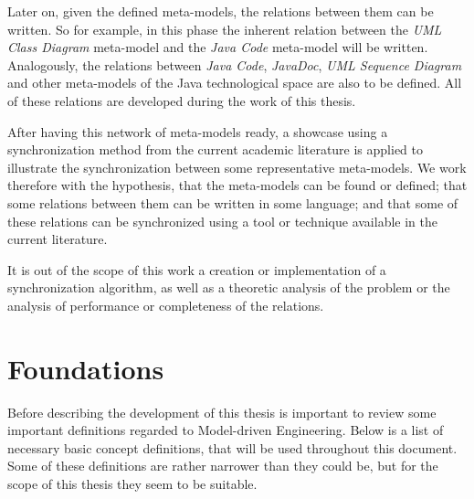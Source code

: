 \documentclass[tuberlin,cic,tc,english,noabntcite]{iiufrgs}
\begin{document}
Later on, given the defined meta-models, the relations between them can be written. So for example, in this phase the inherent relation between the \emph{UML Class Diagram} meta-model and the \emph{Java Code} meta-model will be written. Analogously, the relations between \emph{Java Code}, \emph{JavaDoc}, \emph{UML Sequence Diagram} and other meta-models of the Java technological space are also to be defined. All of these relations are developed during the work of this thesis.

After having this network of meta-models ready, a showcase using a synchronization method from the current academic literature is applied to illustrate the synchronization between some representative meta-models. We work therefore with the hypothesis, that the meta-models can be found or defined; that some relations between them can be written in some language; and that some of these relations can be synchronized using a tool or technique available in the current literature.

It is out of the scope of this work a creation or implementation of a synchronization algorithm, as well as a theoretic analysis of the problem or the analysis of performance or completeness of the relations.

\chapter{Foundations}
\label{ch:foundations}
Before describing the development of this thesis is important to review some important definitions regarded to Model-driven Engineering. Below is a list of necessary basic concept definitions, that will be used throughout this document. Some of these definitions are rather narrower than they could be, but for the scope of this thesis they seem to be suitable.
\end{document}
